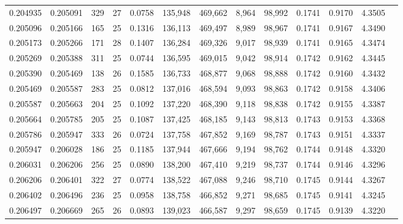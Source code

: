 \begin{tabular}{rrrrrrrrrrrrr}
0.204935 & 0.205091 &   329 &  27 &                                     0.0758 & 135,948 & 469,662 &   8,964 &  98,992 & 0.1741 & 0.9170 & 4.3505 \\
0.205096 & 0.205166 &   165 &  25 &                                     0.1316 & 136,113 & 469,497 &   8,989 &  98,967 & 0.1741 & 0.9167 & 4.3490 \\
0.205173 & 0.205266 &   171 &  28 &                                     0.1407 & 136,284 & 469,326 &   9,017 &  98,939 & 0.1741 & 0.9165 & 4.3474 \\
0.205269 & 0.205388 &   311 &  25 &                                     0.0744 & 136,595 & 469,015 &   9,042 &  98,914 & 0.1742 & 0.9162 & 4.3445 \\
0.205390 & 0.205469 &   138 &  26 &                                     0.1585 & 136,733 & 468,877 &   9,068 &  98,888 & 0.1742 & 0.9160 & 4.3432 \\
0.205469 & 0.205587 &   283 &  25 &                                     0.0812 & 137,016 & 468,594 &   9,093 &  98,863 & 0.1742 & 0.9158 & 4.3406 \\
0.205587 & 0.205663 &   204 &  25 &                                     0.1092 & 137,220 & 468,390 &   9,118 &  98,838 & 0.1742 & 0.9155 & 4.3387 \\
0.205664 & 0.205785 &   205 &  25 &                                     0.1087 & 137,425 & 468,185 &   9,143 &  98,813 & 0.1743 & 0.9153 & 4.3368 \\
0.205786 & 0.205947 &   333 &  26 &                                     0.0724 & 137,758 & 467,852 &   9,169 &  98,787 & 0.1743 & 0.9151 & 4.3337 \\
0.205947 & 0.206028 &   186 &  25 &                                     0.1185 & 137,944 & 467,666 &   9,194 &  98,762 & 0.1744 & 0.9148 & 4.3320 \\
0.206031 & 0.206206 &   256 &  25 &                                     0.0890 & 138,200 & 467,410 &   9,219 &  98,737 & 0.1744 & 0.9146 & 4.3296 \\
0.206206 & 0.206401 &   322 &  27 &                                     0.0774 & 138,522 & 467,088 &   9,246 &  98,710 & 0.1745 & 0.9144 & 4.3267 \\
0.206402 & 0.206496 &   236 &  25 &                                     0.0958 & 138,758 & 466,852 &   9,271 &  98,685 & 0.1745 & 0.9141 & 4.3245 \\
0.206497 & 0.206669 &   265 &  26 &                                     0.0893 & 139,023 & 466,587 &   9,297 &  98,659 & 0.1745 & 0.9139 & 4.3220 \\

\end{tabular}
